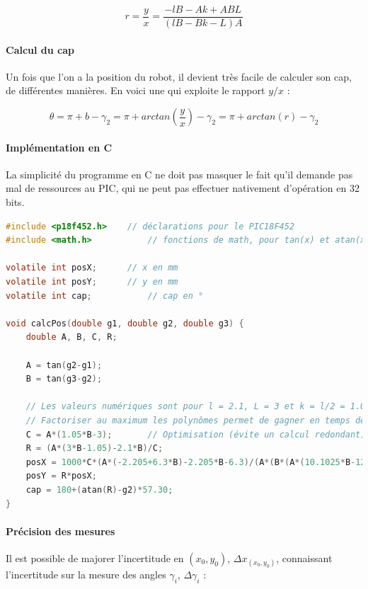 \documentclass[a4paper]{article}
\begin{document}
\[r = \frac{y}{x} = \frac{-l B-A k+A B L}{(l B-B k-L) A}\]

\paragraph{Calcul du cap}

Un fois que l'on a la position du robot, il devient très facile de calculer son cap, de différentes manières. En voici une qui exploite le rapport $y/x$ :

\[\theta = \pi+b-\gamma_{2} = \pi+arctan\left(\frac{y}{x}\right)-\gamma_{2} = \pi+arctan(r)-\gamma_{2}\]

\paragraph{Implémentation en C}

La simplicité du programme en C ne doit pas masquer le fait qu'il demande pas mal de ressources au PIC, qui ne peut pas effectuer nativement d'opération en 32 bits.

\begin{lstlisting}[caption=Implémentation du calcul de la position et du cap en C, label=Implementation_du_calcul_de_la_position_et_du_cap_en_C, language=C]
#include <p18f452.h>	// déclarations pour le PIC18F452
#include <math.h>			// fonctions de math, pour tan(x) et atan(x)

volatile int posX;		// x en mm
volatile int posY;		// y en mm
volatile int cap;			// cap en °

void calcPos(double g1, double g2, double g3) {
	double A, B, C, R;

	A = tan(g2-g1);
	B = tan(g3-g2);

	// Les valeurs numériques sont pour l = 2.1, L = 3 et k = l/2 = 1.05
	// Factoriser au maximum les polynômes permet de gagner en temps de calcul
	C = A*(1.05*B-3);		// Optimisation (évite un calcul redondant)
	R = (A*(3*B-1.05)-2.1*B)/C;
	posX = 1000*C*(A*(-2.205+6.3*B)-2.205*B-6.3)/(A*(B*(A*(10.1025*B-12.6)+4.41-12.6*B)+10.1025*A)+4.41*B*B);
	posY = R*posX;
	cap = 180+(atan(R)-g2)*57.30;
}
\end{lstlisting}

\paragraph{Précision des mesures}

Il est possible de majorer l'incertitude en $(x_{0}, y_{0})$, $\Delta x_{(x_{0}, y_{0})}$, connaissant l'incertitude sur la mesure des angles $\gamma_{i}$, $\Delta \gamma_{i}$ :
\end{document}
